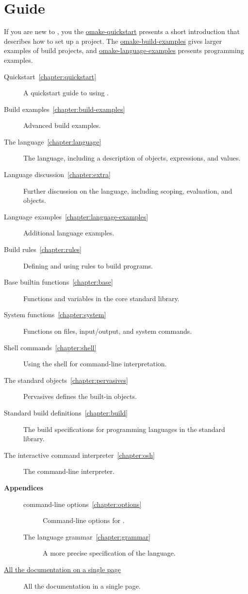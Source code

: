 %
\chapter{Guide}
\label{chapter:omake}
\label{section:guide}

If you are new to \OMake{}, you the \href{omake-quickstart.html}{omake-quickstart} presents a short
introduction that describes how to set up a project.  The
\href{omake-build-examples.html}{omake-build-examples} gives larger examples of build projects, and
\href{omake-language-examples.html}{omake-language-examples} presents programming examples.

\begin{description}
\item[Quickstart~\ref{chapter:quickstart}]
%
   A quickstart guide to using .
\item[Build examples~\ref{chapter:build-examples}]
%
   Advanced build examples.
\item[The \OMake{} language~\ref{chapter:language}]
%
   The  language, including a description of objects, expressions, and values.
\item[Language discussion~\ref{chapter:extra}]
%
   Further discussion on the language, including scoping, evaluation, and objects.
\item[Language examples~\ref{chapter:language-examples}]
%
   Additional language examples.
\item[Build rules~\ref{chapter:rules}]
%
   Defining and using rules to build programs.
\item[Base builtin functions~\ref{chapter:base}]
%
   Functions and variables in the core standard library.
\item[System functions~\ref{chapter:system}]
%
   Functions on files, input/output, and system commands.
\item[Shell commands~\ref{chapter:shell}]
%
   Using the  shell for command-line interpretation.
\item[The standard objects~\ref{chapter:pervasives}]
%
   Pervasives defines the built-in objects.
\item[Standard build definitions~\ref{chapter:build}]
%
   The build specifications for programming languages in the \OMake{} standard library.
\item[The interactive command interpreter~\ref{chapter:osh}]
%
   The  command-line interpreter.
\item[\textbf{Appendices}]
\begin{description}
\item[\OMake{} command-line options~\ref{chapter:options}]
%
   Command-line options for .
%
\item[The \OMake{} language grammar~\ref{chapter:grammar}]
%
   A more precise specification of the \OMake{} language.
\end{description}
\item[\href{omake-doc.html}{All the documentation on a single page}]
%
   All the \OMake{} documentation in a single page.
\end{description}

